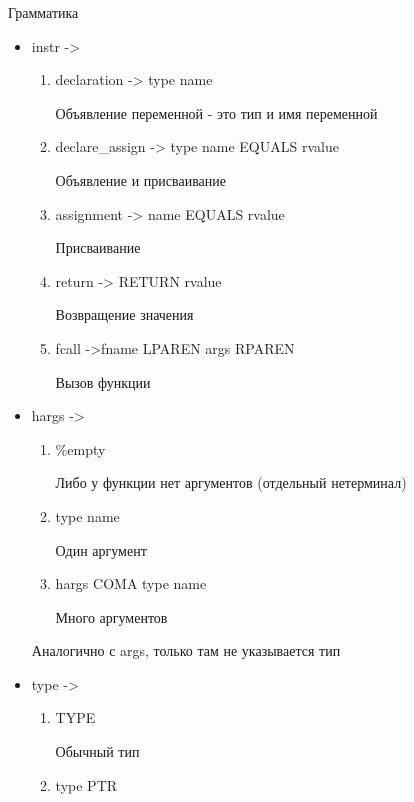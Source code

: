 \begin{para}{Грамматика}
\begin{itemize}
	\item instr ->
	
		\begin{enumerate}
		
			\item declaration -> type name
			
			Объявление переменной - это тип и имя переменной
			
			\item declare\_assign -> type name EQUALS rvalue
			
			Объявление и присваивание
			
			\item assignment -> name EQUALS rvalue
			
			Присваивание
			
			\item return -> RETURN rvalue
			
			Возвращение значения
			
			\item fcall ->fname LPAREN args RPAREN
			
			Вызов функции	
		
		\end{enumerate}
		
	\item hargs ->
		
		\begin{enumerate}
			
			\item \%empty
			
			Либо у функции нет аргументов (отдельный нетерминал)
			
			\item type name
			
			Один аргумент
			
			\item hargs COMA type name
		
			Много аргументов			
			
		\end{enumerate}
		
	Аналогично с args, только там не указывается тип
	
	\item type ->
	
		\begin{enumerate}

			\item TYPE
			
			Обычный тип
			
			\item type PTR
			

\end{enumerate}
\end{itemize}
\end{para}
